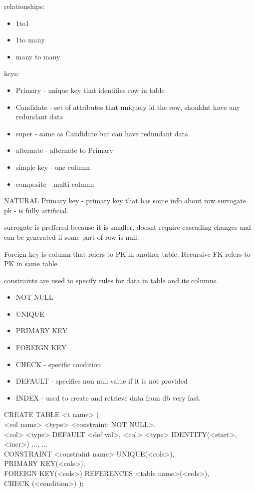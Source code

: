 \documentclass{article}
\begin{document}
    relationships:
    \begin{itemize}
        \item 1to1
        \item 1to many
        \item many to many 
    \end{itemize}

    keys:
    \begin{itemize}
        \item Primary - unique key that identifies row in table
        \item Candidate - set of attributes that uniquely id the row, shouldnt have any redundant data
        \item super - same as Candidate but can have redundant data
        \item alternate - alternate to Primary
        \item simple key - one column
        \item composite - multi column
    \end{itemize}

    NATURAL Primary key - primary key that has some info about row
    surrogate pk - is fully artificial.

    surrogate is preffered because it is smaller,
    doesnt require cascading changes and can be generated if some part of row is null.

    Foreign key is column that refers to PK in another table.
    Recursive FK refers to PK in same table.

    constraints are used to specify rules for data in table and its columns.
    \begin{itemize}
        \item NOT NULL
        \item UNIQUE
        \item PRIMARY KEY
        \item FOREIGN KEY
        \item CHECK - specific condition
        \item DEFAULT - specifies non null value if it is not provided
        \item INDEX - used to create and retrieve data from db very fast.
    \end{itemize}

    CREATE TABLE <t name> ( \\
        <col name> <type> <constraint: NOT NULL>, \\
        <col> <type> DEFAULT <def val>,
        <col> <type> IDENTITY(<start>, <incr>) ...,
        ...\\
        CONSTRAINT <constraint name> UNIQUE(<cols>), \\
        PRIMARY KEY(<cols>), \\
        FOREIGN KEY(<cols>) REFERENCES <table name>(<cols>), \\
        CHECK (<condition>)
    );
\end{document}
